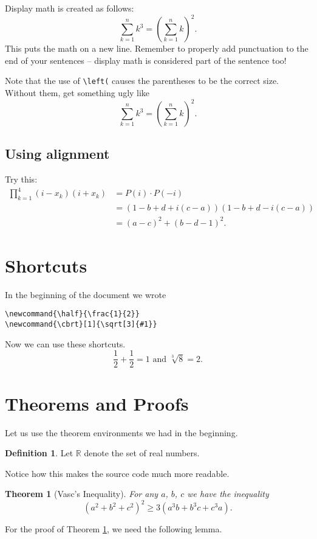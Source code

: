 \documentclass[11pt]{article}
\theoremstyle{plain} %
\newtheorem{theorem}{Theorem}
\theoremstyle{definition}
\newtheorem*{definition}{Definition} %
\theoremstyle{remark}
\newcommand{\half}{\frac{1}{2}}
\newcommand{\cbrt}[1]{\sqrt[3]{#1}}
\begin{document}
Display math is created as follows:
\[ \sum_{k=1}^n k^3 = \left( \sum_{k=1}^n k \right)^2. \]
This puts the math on a new line.
Remember to properly add punctuation to the
end of your sentences -- display math is
considered part of the sentence too!

Note that the use of \verb+\left(+
causes the parentheses to be the correct size.
Without them, get something ugly like
\[ \sum_{k=1}^n k^3 = ( \sum_{k=1}^n k )^2. \]

\subsection{Using alignment}
Try this:
\begin{align*}
	\prod_{k=1}^4 \left( i-x_k \right)\left( i+x_k \right) &= P(i) \cdot P(-i) \\
	&= \left( 1-b+d+i(c-a) \right)\left( 1-b+d-i(c-a) \right) \\
	&= (a-c)^2 + \left( b-d-1 \right)^2.
\end{align*}

\section{Shortcuts}
In the beginning of the document we wrote
\begin{verbatim}
\newcommand{\half}{\frac{1}{2}}
\newcommand{\cbrt}[1]{\sqrt[3]{#1}}
\end{verbatim}
Now we can use these shortcuts.
\[ \half + \half = 1 \text{ and } \cbrt{8} = 2. \]

\section{Theorems and Proofs}
\label{sec:theorem}
Let us use the theorem environments we had in the beginning.
\begin{definition}
	Let $\mathbb R$ denote the set of real numbers.
\end{definition}
Notice how this makes the source code much more readable.

\begin{theorem}
	[Vasc's Inequality]
	\label{thm:vasc}
	For any $a$, $b$, $c$ we have the inequality
	\[ \left( a^2+b^2+c^2 \right)^2 \ge 3\left( a^3b+b^3c+c^3a \right). \]
\end{theorem}

For the proof of Theorem \ref{thm:vasc}, we need the following lemma.
\end{document}
